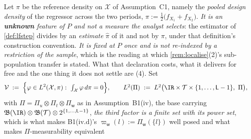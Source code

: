 \begin{definition}\label{def:spaces}
Let $\pi$ be the reference density on $\mathcal X$ of Assumption~C1, namely the \emph{pooled design
density} of the regressor across the two periods,
$\pi:=\tfrac12\big(f_{X_1}+f_{X_2}\big)$.
\emph{It is an \textbf{unknown} feature of $P$ and not a measure the analyst selects}: the estimator of
\cref{def:lfstep} divides by an \emph{estimate} $\hat\pi$ of it and not by $\pi$, under that
definition's construction convention. \emph{It is fixed at $P$ once and is not re-indexed by a
restriction of the sample}, which is the reading at which \cref{rem:localise}\textup{(2)}'s
sub-population transfer is stated. What that declaration costs, what it delivers for free and the one
thing it does not settle are \textup{(4)}.
Set
\[
\mathcal V\;:=\;\Big\{\varphi\in L^{2}(\mathcal X,\pi):\ \textstyle\int_{\mathcal X}\varphi\,d\pi=0\Big\},
\qquad
L^{2}(\Pi)\;:=\;L^{2}\big(\IR\times\mathcal T\times\{1,\dots,\mathsf L-1\},\ \Pi\big),
\]
with $\Pi=\Pi_u\otimes\Pi_t\otimes\Pi_{\mathsf w}$ as in Assumption~B1(iv), the base carrying
$\mathfrak B(\IR)\otimes\mathfrak B(\mathcal T)\otimes2^{\{1,\dots,\mathsf L-1\}}$, \emph{the third
factor is a finite set with its power set}, which is what makes B1(iv.d)'s
$\varpi_{\mathsf w}(l):=\Pi_{\mathsf w}(\{l\})$ well posed and what makes $\Pi$-measurability equivalent

\end{definition}
